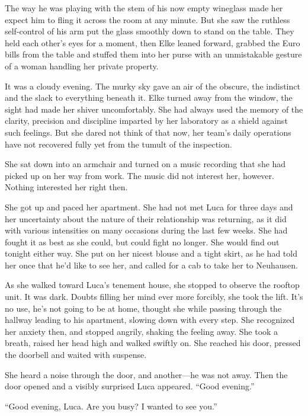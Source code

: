 The way he was playing with the stem of his now empty wineglass made her expect him to fling it across the room at any minute. But she saw the ruthless self-control of his arm put the glass smoothly down to stand on the table. They held each other's eyes for a moment, then Elke leaned forward, grabbed the Euro bills from the table and stuffed them into her purse with an unmistakable gesture of a woman handling her private property.

\sectionline

It was a cloudy evening. The murky sky gave an air of the obscure, the indistinct and the slack to everything beneath it. Elke turned away from the window, the sight had made her shiver uncomfortably. She had always used the memory of the clarity, precision and discipline imparted by her laboratory as a shield against such feelings. But she dared not think of that now, her team's daily operations have not recovered fully yet from the tumult of the inspection.

She sat down into an armchair and turned on a music recording that she had picked up on her way from work. The music did not interest her, however. Nothing interested her right then.

She got up and paced her apartment. She had not met Luca for three days and her uncertainty about the nature of their relationship was returning, as it did with various intensities on many occasions during the last few weeks. She had fought it as best as she could, but could fight no longer. She would find out tonight either way. She put on her nicest blouse and a tight skirt, as he had told her once that he'd like to see her, and called for a cab to take her to Neuhausen.

As she walked toward Luca's tenement house, she stopped to observe the rooftop unit. It was dark. Doubts filling her mind ever more forcibly, she took the lift. It's no use, he's not going to be at home, thought she while passing through the hallway leading to his apartment, slowing down with every step. She recognized her anxiety then, and stopped angrily, shaking the feeling away. She took a breath, raised her head high and walked swiftly on. She reached his door, pressed the doorbell and waited with suspense.

She heard a noise through the door, and another---he was not away. Then the door opened and a visibly surprised Luca appeared. ``Good evening.''

``Good evening, Luca. Are you busy? I wanted to see you.''

